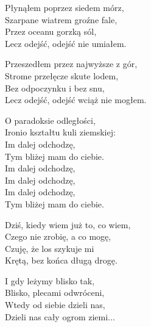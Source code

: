 \begin{text}
    Płynąłem poprzez siedem mórz,\\
    Szarpane wiatrem groźne fale,\\
    Przez oceanu gorzką sól,\\
    Lecz odejść, odejść nie umiałem.

    Przeszedłem przez najwyższe z gór,\\
    Strome przełęcze skute lodem,\\
    Bez odpoczynku i bez snu,\\
    Lecz odejść, odejść wciąż nie mogłem.

    O paradoksie odległości,\\
    Ironio kształtu kuli ziemskiej:\\
    Im dalej odchodzę,\\
    Tym bliżej mam do ciebie.\\
    Im dalej odchodzę,\\
    Im dalej odchodzę,\\
    Im dalej odchodzę,\\
    Tym bliżej mam do ciebie.

    Dziś, kiedy wiem już to, co wiem,\\
    Czego nie zrobię, a co mogę,\\
    Czuję, że los szykuje mi\\
    Krętą, bez końca długą drogę.

    I gdy leżymy blisko tak,\\
    Blisko, plecami odwróceni,\\
    Wtedy od siebie dzieli nas,\\
    Dzieli nas cały ogrom ziemi...
\end{text}
\begin{chord}

\end{chord}